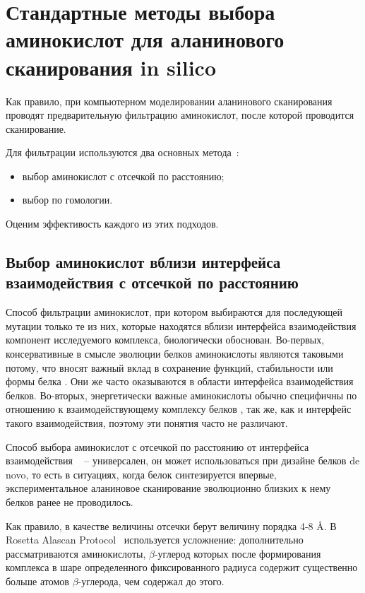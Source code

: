\newpage
\section{Стандартные методы выбора аминокислот для аланинового сканирования in silico}

Как правило, при компьютерном моделировании аланинового сканирования проводят предварительную фильтрацию аминокислот, после которой проводится сканирование. 

Для фильтрации используются два основных метода~\cite{hotspots2012rev}:
\begin{itemize}
\item выбор аминокислот с отсечкой по расстоянию;

\item выбор по гомологии.
\end{itemize}

Оценим эффективость каждого из этих подходов.

\subsection{Выбор аминокислот вблизи интерфейса взаимодействия с отсечкой по расстоянию}

Способ фильтрации аминокислот, при котором выбираются для последующей мутации только те из них, которые находятся вблизи интерфейса взаимодействия компонент исследуемого комплекса, биологически обоснован. Во-первых,  консервативные в смысле эволюции белков аминокислоты являются таковыми потому, что вносят важный вклад в сохранение функций, стабильности или формы белка \cite{toadd}. Они же часто оказываются в области интерфейса взаимодействия белков. Во-вторых, энергетически важные аминокислоты обычно специфичны по отношению к взаимодействующему комплексу белков \cite{toadd1}, так же, как и интерфейс такого взаимодействия, поэтому эти понятия часто не различают.

Способ выбора аминокислот с  отсечкой по расстоянию от интерфейса взаимодействия ~\cite{kortemme2004} -- универсален, он может использоваться при дизайне белков de novo, то есть в ситуациях, когда белок синтезируется впервые, экспериментальное аланиновое сканирование эволюционно близких к нему белков ранее не проводилось. 

Как правило, в качестве величины отсечки берут величину порядка  4-8 \AA{}. В  Rosetta Alascan Protocol~\cite{kortemme2004} используется усложнение: дополнительно рассматриваются аминокислоты, $\beta$-углерод которых после формирования комплекса в шаре определенного фиксированного радиуса содержит существенно больше атомов $\beta$-углерода, чем содержал до этого.

